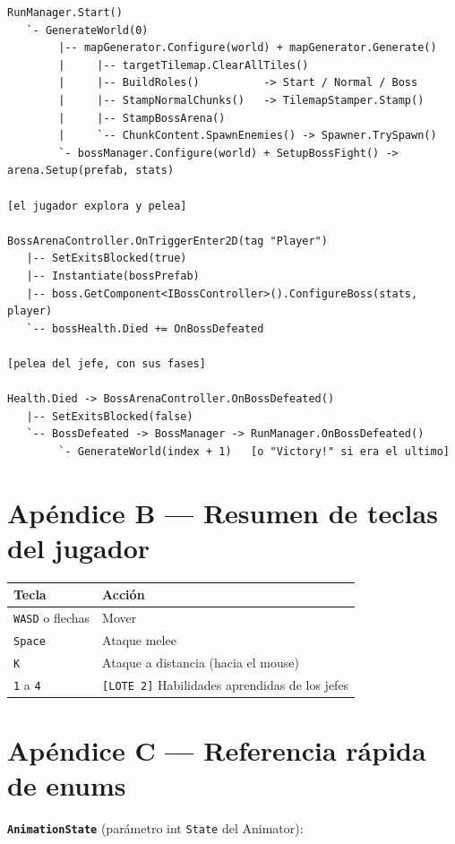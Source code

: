 \documentclass[a4paper,12pt]{article}
\newcommand{\code}[1]{\texttt{#1}}
\begin{document}
\begin{verbatim}
RunManager.Start()
   `- GenerateWorld(0)
        |-- mapGenerator.Configure(world) + mapGenerator.Generate()
        |     |-- targetTilemap.ClearAllTiles()
        |     |-- BuildRoles()          -> Start / Normal / Boss
        |     |-- StampNormalChunks()   -> TilemapStamper.Stamp()
        |     |-- StampBossArena()
        |     `-- ChunkContent.SpawnEnemies() -> Spawner.TrySpawn()
        `- bossManager.Configure(world) + SetupBossFight() -> arena.Setup(prefab, stats)

[el jugador explora y pelea]

BossArenaController.OnTriggerEnter2D(tag "Player")
   |-- SetExitsBlocked(true)
   |-- Instantiate(bossPrefab)
   |-- boss.GetComponent<IBossController>().ConfigureBoss(stats, player)
   `-- bossHealth.Died += OnBossDefeated

[pelea del jefe, con sus fases]

Health.Died -> BossArenaController.OnBossDefeated()
   |-- SetExitsBlocked(false)
   `-- BossDefeated -> BossManager -> RunManager.OnBossDefeated()
        `- GenerateWorld(index + 1)   [o "Victory!" si era el ultimo]
\end{verbatim}

\section{Apéndice B --- Resumen de teclas del jugador}

\begin{center}
\begin{tabular}{|l|l|}
\hline
\textbf{Tecla} & \textbf{Acción} \\
\hline
\code{WASD} o flechas & Mover \\
\hline
\code{Space} & Ataque melee \\
\hline
\code{K} & Ataque a distancia (hacia el mouse) \\
\hline
\code{1} a \code{4} & \code{[LOTE 2]} Habilidades aprendidas de los jefes \\
\hline
\end{tabular}
\end{center}

\section{Apéndice C --- Referencia rápida de enums}

\textbf{\code{AnimationState}} (parámetro int \code{State} del Animator):
\end{document}
